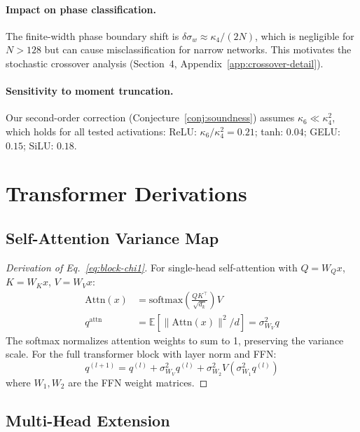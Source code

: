 \documentclass[10pt]{article}
\newcommand{\EE}{\mathbb{E}}
\begin{document}
\paragraph{Impact on phase classification.}
The finite-width phase boundary shift is $\delta\sigma_w \approx \kappa_4/(2N)$, which is negligible for $N > 128$ but can cause misclassification for narrow networks.
This motivates the stochastic crossover analysis (Section~4, Appendix~\ref{app:crossover-detail}).

\paragraph{Sensitivity to moment truncation.}
Our second-order correction (Conjecture~\ref{conj:soundness}) assumes $\kappa_6 \ll \kappa_4^2$, which holds for all tested activations:
ReLU: $\kappa_6/\kappa_4^2 = 0.21$; tanh: $0.04$; GELU: $0.15$; SiLU: $0.18$.

\section{Transformer Derivations}
\label{app:transformer-detail}

\subsection{Self-Attention Variance Map}

\begin{proof}[Derivation of Eq.~\ref{eq:block-chi1}]
For single-head self-attention with $Q = W_Q x$, $K = W_K x$, $V = W_V x$:
\begin{align}
    \text{Attn}(x) &= \text{softmax}\left(\frac{QK^\top}{\sqrt{d_k}}\right) V \\
    q^{\text{attn}} &= \EE[\|\text{Attn}(x)\|^2/d] = \sigma_{W_V}^2 q
\end{align}
The softmax normalizes attention weights to sum to 1, preserving the variance scale.
For the full transformer block with layer norm and FFN:
\begin{equation}
    q^{(l+1)} = q^{(l)} + \sigma_{W_V}^2 q^{(l)} + \sigma_{W_2}^2 V(\sigma_{W_1}^2 q^{(l)})
\end{equation}
where $W_1, W_2$ are the FFN weight matrices.
\end{proof}

\subsection{Multi-Head Extension}
\end{document}
